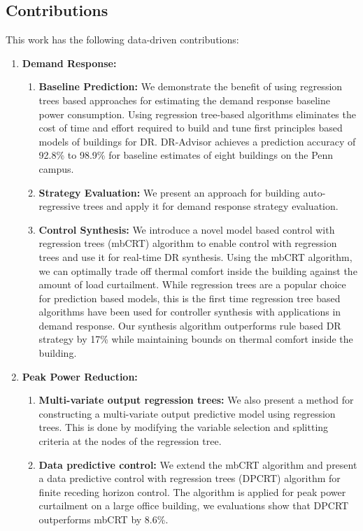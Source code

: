\subsection{Contributions}

This work has the following data-driven contributions:

\begin{enumerate}
\item \textbf{Demand Response:}
\begin{enumerate} %
\item \textbf{Baseline Prediction:} We demonstrate the benefit of using regression trees based approaches for estimating the demand response baseline power consumption. Using regression tree-based algorithms eliminates the cost of time and effort required to build and tune first principles based models of buildings for DR. 
DR-Advisor achieves a prediction accuracy of 92.8\% to 98.9\% for baseline estimates of eight buildings on the Penn campus.
\item \textbf{Strategy Evaluation:} We present an approach for building auto-regressive trees and apply it for demand response strategy evaluation. 
\item \textbf{Control Synthesis:}  We introduce a novel model based control with regression trees (mbCRT) algorithm to enable control with regression trees and use it for real-time DR synthesis. Using the mbCRT algorithm, we can optimally trade off thermal comfort inside the building against the amount of load curtailment. While regression trees are a popular choice for prediction based models, this is the first time regression tree based algorithms have been used for controller synthesis with applications in demand response. Our synthesis algorithm outperforms rule based DR strategy by 17\% while maintaining bounds on thermal comfort inside the building.
\end{enumerate}

\item \textbf{Peak Power Reduction:}
\begin{enumerate} %
\item \textbf{Multi-variate output regression trees:} We also present a method for constructing a multi-variate output predictive model using regression trees. This is done by modifying the variable selection and splitting criteria at the nodes of the regression tree.
\item \textbf{Data predictive control:} We extend the mbCRT algorithm and present a data predictive control with regression trees (DPCRT) algorithm for finite receding horizon control. The algorithm is applied for peak power curtailment on a large office building, we evaluations show that DPCRT outperforms mbCRT by 8.6\%.
\end{enumerate}


\end{enumerate}
